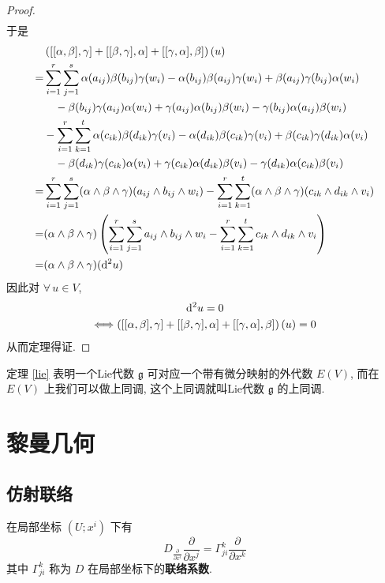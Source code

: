 \documentclass{book}
\newcommand{\md}{{\rm d}}
\newcommand{\pd}[2]{\frac{\partial #1}{\partial #2}}
\begin{document}
\begin{proof}
\begin{align*}
            \end{align*}
            于是
            \begin{align*}
                &\left([[\alpha,\beta],\gamma]+[[\beta,\gamma],\alpha]+[[\gamma,\alpha],\beta]\right)(u) \\
                =&\sum_{i=1}^{r}\sum_{j=1}^{s}\alpha(a_{ij})\beta(b_{ij})\gamma(w_i)-\alpha(b_{ij})\beta(a_{ij})\gamma(w_i)+\beta(a_{ij})\gamma(b_{ij})\alpha(w_i) \\
                &\quad-\beta(b_{ij})\gamma(a_{ij})\alpha(w_i)+\gamma(a_{ij})\alpha(b_{ij})\beta(w_i)-\gamma(b_{ij})\alpha(a_{ij})\beta(w_i) \\
                &-\sum_{i=1}^{r}\sum_{k=1}^{t}\alpha(c_{ik})\beta(d_{ik})\gamma(v_i)-\alpha(d_{ik})\beta(c_{ik})\gamma(v_i)+\beta(c_{ik})\gamma(d_{ik})\alpha(v_i) \\
                &\quad-\beta(d_{ik})\gamma(c_{ik})\alpha(v_i)+\gamma(c_{ik})\alpha(d_{ik})\beta(v_i)-\gamma(d_{ik})\alpha(c_{ik})\beta(v_i) \\
                =&\sum_{i=1}^{r}\sum_{j=1}^{s}(\alpha\wedge\beta\wedge\gamma)(a_{ij}\wedge b_{ij}\wedge w_i)-\sum_{i=1}^{r}\sum_{k=1}^{t}(\alpha\wedge\beta\wedge\gamma)(c_{ik}\wedge d_{ik}\wedge v_i) \\
                =&(\alpha\wedge\beta\wedge\gamma)\left(\sum_{i=1}^{r}\sum_{j=1}^{s}a_{ij}\wedge b_{ij}\wedge w_i-\sum_{i=1}^{r}\sum_{k=1}^{t}c_{ik}\wedge d_{ik}\wedge v_i\right) \\
                =&(\alpha\wedge\beta\wedge\gamma)(\md^2 u)
            \end{align*}
            因此对 $\forall\,u\in V$,
            \begin{gather*}
                \md^2 u = 0 \\
                \Longleftrightarrow \left([[\alpha,\beta],\gamma]+[[\beta,\gamma],\alpha]+[[\gamma,\alpha],\beta]\right)(u) = 0
            \end{gather*}
            从而定理得证.
        \end{proof}
        定理 \ref{lie} 表明一个{\rm Lie}代数 $\mathfrak{g}$ 可对应一个带有微分映射的外代数 $E(V)$, 而在 $E(V)$ 上我们可以做上同调,
        这个上同调就叫{\rm Lie}代数 $\mathfrak{g}$ 的上同调.

    \chapter{黎曼几何}
    \section{仿射联络}
        在局部坐标 $\left(U;x^i\right)$ 下有
        \begin{equation*}
            D_{\pd{}{x^i}}\pd{}{x^j}=\Gamma^{k}_{ji}\pd{}{x^k}
        \end{equation*}
        其中 $\Gamma^{k}_{ji}$ 称为 $D$ 在局部坐标下的\textbf{联络系数}.
\end{document}
